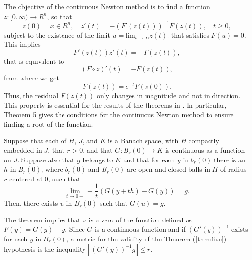 \documentclass[11pt]{article}
\begin{document}
	The objective of the continuous Newton method is to find a function $z: [0, \infty) \rightarrow R^n$, so that
    \begin{equation} z(0) = x \in R^n, \quad z' (t) = - \left(F' (z(t)) \right)^{-1} F(z(t)), \quad t \geq 0, \label{eqn:contNewton}\end{equation}
    subject to the existence of the limit $u=\mathrm{lim}_{t \rightarrow \infty}{z(t)}$, that satisfies $F(u)=0$.
    This implies 
    \begin{equation}  F' (z(t)) z' (t) = - F(z(t)) , \end{equation}
    that is equivalent to
    \begin{equation}  \left(F \circ z\right)' (t) = - F(z(t)) , \end{equation}
    from where we get
    \begin{equation}  F(z(t)) = e^{-t} F(z(0)) . \end{equation}
    Thus, the residual $F(z(t))$ only changes in magnitude and not in direction.
    This property is essential for the results of the theorems in \cite{Neuberger07}. 
    In particular, Theorem 5 gives the conditions for the continuous Newton method to ensure finding a root of the function.
    
    \begin{customthm}{5} \label{thm:five}
    Suppose that each of $H$, $J$, and $K$ is a Banach space, with $H$ compactly embedded in $J$, that $r>0$, and that $G:B_r(0) \rightarrow K$ is continuous as a function on $J$. Suppose also that $g$ belongs to $K$ and that for each $y$ in $b_r(0)$ there is an $h$ in $B_r(0)$, where $b_r(0)$ and $B_r(0)$ are open and closed balls in $H$ of radius $r$ centered at 0, such that
    \begin{equation} \lim\limits_{t \to 0+} -{\dfrac{1}{t} \left(G(y+th) - G(y)\right) = g}. \end{equation}
    Then, there exists $u$ in $B_r(0)$ such that $G(u)=g$.
    \end{customthm}
    
    The theorem implies that $u$ is a zero of the function  defined as $F(y) = G(y) - g$.  
    Since $G$ is a continuous function and if $\left(G' (y) \right)^{-1}$ exists for each $y$ in $B_r(0)$, a metric for the validity of the Theorem (\ref{thm:five}) hypothesis is the inequality $\left\Vert  \left( G' (y) \right)^{-1} g \right\Vert \leq r$.
    
\end{document}

